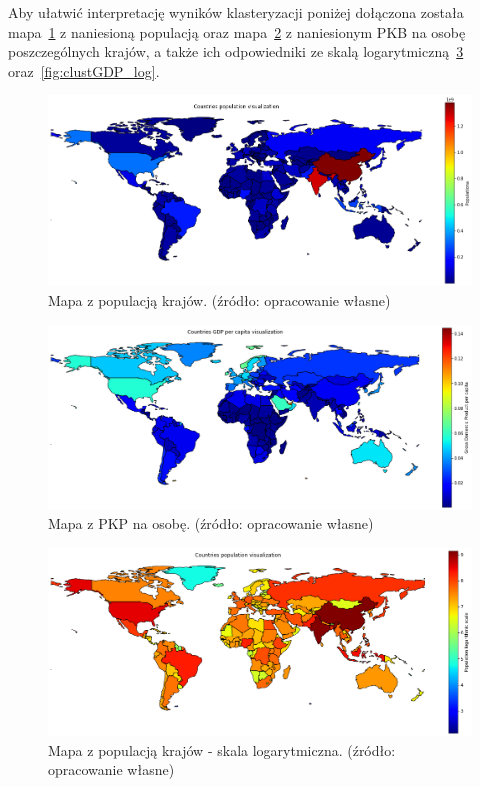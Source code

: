 \documentclass[11pt]{report}
\begin{document}
    Aby ułatwić interpretację wyników klasteryzacji poniżej dołączona została mapa~\ref{fig:clustPop} z naniesioną populacją oraz mapa~\ref{fig:clustGDP} z naniesionym PKB na osobę poszczególnych krajów, a także ich odpowiedniki ze skalą logarytmiczną~\ref{fig:clustPop_log} oraz~\ref{fig:clustGDP_log}.

    \begin{figure}[!htp]
        \centering
        \includegraphics[width=\linewidth]{fig/CLUST/population.png}
        \caption{Mapa z populacją krajów. (źródło: opracowanie własne)}
        \label{fig:clustPop}
    \end{figure}

    \begin{figure}[!htp]
        \centering
        \includegraphics[width=\linewidth]{fig/CLUST/gdp.png}
        \caption{Mapa z PKP na osobę. (źródło: opracowanie własne)}
        \label{fig:clustGDP}
    \end{figure}

    \begin{figure}[!htp]
        \centering
        \includegraphics[width=\linewidth]{fig/CLUST/population_log.png}
        \caption{Mapa z populacją krajów - skala logarytmiczna. (źródło: opracowanie własne)}
        \label{fig:clustPop_log}
    \end{figure}
\end{document}
